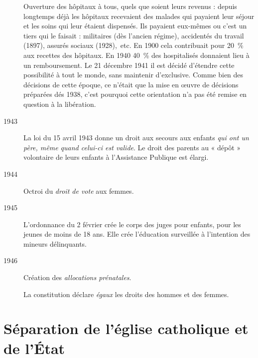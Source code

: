 \begin{description}
Ouverture des hôpitaux à tous, quels que soient leurs revenus : depuis longtemps déjà les hôpitaux recevaient des malades qui payaient leur séjour et les soins qui leur étaient dispensés. Ils payaient eux-mêmes ou c'est un tiers qui le faisait : militaires (dès l'ancien régime), accidentés du travail (1897), assurés sociaux (1928),~etc. En 1900 cela contribuait pour 20~\% aux recettes des hôpitaux. En 1940 40~\% des hospitalisés donnaient lieu à un remboursement. Le 21 décembre 1941 il est décidé d'étendre cette possibilité à tout le monde, sans maintenir d'exclusive. Comme bien des décisions de cette époque, ce n'était que la mise en œuvre de décisions préparées dés 1938, c'est pourquoi cette orientation n'a pas été remise en question à la libération.

\item[1943] La loi du 15 avril 1943 donne un droit aux secours aux enfants \emph{qui ont un père, même quand celui-ci est valide}. Le droit des parents au « dépôt » volontaire de leurs enfants à l'Assistance Publique est élargi.

\item[1944] Octroi du \emph{droit de vote} aux femmes. 

\item[1945] L'ordonnance du 2 février crée le corps des juges pour enfants, pour les jeunes de moins de 18 ans. Elle crée l'éducation surveillée à l'intention des mineurs délinquants.

\item[1946] Création des \emph{allocations prénatales}.

La constitution déclare \emph{égaux} les droits des hommes et des femmes.
\end{description}

\section{Séparation de l'église catholique et de l'État}


